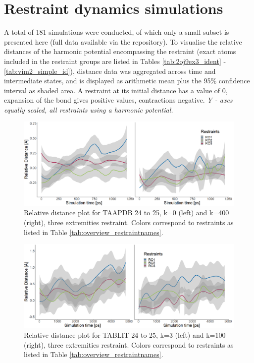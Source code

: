 \documentclass[oneside]{scrreprt}
\begin{document}
\section{Restraint dynamics simulations}\label{sec:results_resdynamics}
A total of 181 simulations were conducted, of which only a small subset is presented here (full data available via the repository). To visualise the relative distances of the harmonic potential encompassing the restraint (exact atoms included in the restraint groups are listed in Tables \ref{tab:2oj9ex3_ident} - \ref{tab:vim2_simple_id}), distance data was aggregated across time and intermediate states, and is displayed as arithmetic mean plus the 95\% confidence interval as shaded area. A restraint at its initial distance has a value of 0, expansion of the bond gives positive values, contractions negative. \emph{Y - axes equally scaled, all restraints using a harmonic potential.}
\begin{figure}[H]
    
    


\includegraphics[width=1\textwidth]{plots/rdcombi_taapdb2425_k0_k400_ex3.png}

\caption[Relative distance plot: TAAPDB 24 to 25, k=0 and k=400]{Relative distance plot for TAAPDB  24 to 25, k=0 (left) and k=400 (right), three extremities restraint. Colors correspond to restraints as listed in Table \ref{tab:overview_restraintnames}.}
\label{fig:reldist_taapdb}
\end{figure}

\begin{figure}[H]
    
    \label{fig:reldist_tablit}

\includegraphics[width=1\textwidth]{plots/rdcombi_tablit2425_k3_k100_ex3.png}





\caption[Relative distance plot: TABLIT 24 to 25, k=3 and k=100]{Relative distance plot for TABLIT  24 to 25, k=3 (left) and k=100 (right), three extremities restraint. Colors correspond to restraints as listed in Table \ref{tab:overview_restraintnames}.}
\end{figure}
\end{document}
